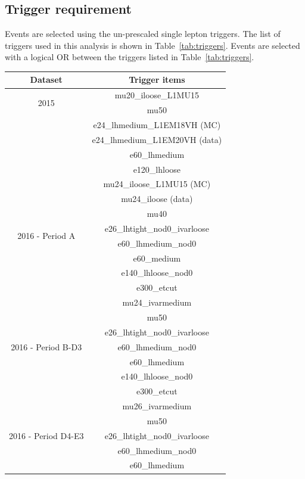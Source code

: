 \subsection{Trigger requirement}
Events are selected using the un-prescaled single lepton triggers. The list of triggers used in this analysis is shown in Table~\ref{tab:triggers}. Events are selected with a logical OR between the triggers listed in Table~\ref{tab:triggers}.
\begin{table}[htbp!]
\begin{center}
 \begin{tabular}{|c|c|}
  \hline
  Dataset & Trigger items \\
  \hline
  \multirow{2}{*}{2015} & mu20\_iloose\_L1MU15  \\
    & mu50  \\
    & e24\_lhmedium\_L1EM18VH (MC)  \\
    & e24\_lhmedium\_L1EM20VH (data)  \\
    & e60\_lhmedium  \\
    & e120\_lhloose  \\
  \hline
  \multirow{8}{*}{2016 - Period A} & mu24\_iloose\_L1MU15 (MC)  \\
    & mu24\_iloose (data)  \\
    & mu40  \\
    & e26\_lhtight\_nod0\_ivarloose  \\
    & e60\_lhmedium\_nod0  \\
    & e60\_medium  \\
    & e140\_lhloose\_nod0  \\
    & e300\_etcut  \\
  \hline
  \multirow{7}{*}{2016 - Period B-D3} & mu24\_ivarmedium  \\
    & mu50  \\
    & e26\_lhtight\_nod0\_ivarloose  \\
    & e60\_lhmedium\_nod0  \\
    & e60\_lhmedium  \\
    & e140\_lhloose\_nod0  \\
    & e300\_etcut  \\
  \hline
  \multirow{7}{*}{2016 - Period D4-E3} & mu26\_ivarmedium  \\
   & mu50  \\
   & e26\_lhtight\_nod0\_ivarloose  \\
   & e60\_lhmedium\_nod0  \\
   & e60\_lhmedium \\

\end{tabular}
\end{center}
\end{table}
